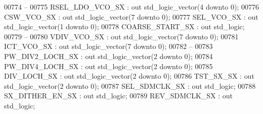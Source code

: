 \begin{DoxyCode}
00774 \textcolor{keyword}{        --}
00775         RSEL\_LDO\_VCO\_SX     : \textcolor{keywordflow}{out} \textcolor{comment}{std\_logic\_vector}(\textcolor{vhdllogic}{}\textcolor{vhdllogic}{4} \textcolor{keywordflow}{downto} \textcolor{vhdllogic}{}\textcolor{vhdllogic}{0});
00776         CSW\_VCO\_SX              : \textcolor{keywordflow}{out} \textcolor{comment}{std\_logic\_vector}(\textcolor{vhdllogic}{}\textcolor{vhdllogic}{7} \textcolor{keywordflow}{downto} \textcolor{vhdllogic}{}\textcolor{vhdllogic}{0});
00777         SEL\_VCO\_SX              : \textcolor{keywordflow}{out} \textcolor{comment}{std\_logic\_vector}(\textcolor{vhdllogic}{}\textcolor{vhdllogic}{1} \textcolor{keywordflow}{downto} \textcolor{vhdllogic}{}\textcolor{vhdllogic}{0});
00778         COARSE\_START\_SX     : \textcolor{keywordflow}{out} \textcolor{comment}{std\_logic};
00779 \textcolor{keyword}{        --}
00780         VDIV\_VCO\_SX : \textcolor{keywordflow}{out} \textcolor{comment}{std\_logic\_vector}(\textcolor{vhdllogic}{}\textcolor{vhdllogic}{7} \textcolor{keywordflow}{downto} \textcolor{vhdllogic}{}\textcolor{vhdllogic}{0});
00781         ICT\_VCO\_SX  : \textcolor{keywordflow}{out} \textcolor{comment}{std\_logic\_vector}(\textcolor{vhdllogic}{}\textcolor{vhdllogic}{7} \textcolor{keywordflow}{downto} \textcolor{vhdllogic}{}\textcolor{vhdllogic}{0});
00782 \textcolor{keyword}{        --}
00783         PW\_DIV2\_LOCH\_SX     : \textcolor{keywordflow}{out} \textcolor{comment}{std\_logic\_vector}(\textcolor{vhdllogic}{}\textcolor{vhdllogic}{2} \textcolor{keywordflow}{downto} \textcolor{vhdllogic}{}\textcolor{vhdllogic}{0});
00784         PW\_DIV4\_LOCH\_SX     : \textcolor{keywordflow}{out} \textcolor{comment}{std\_logic\_vector}(\textcolor{vhdllogic}{}\textcolor{vhdllogic}{2} \textcolor{keywordflow}{downto} \textcolor{vhdllogic}{}\textcolor{vhdllogic}{0});
00785         DIV\_LOCH\_SX             : \textcolor{keywordflow}{out} \textcolor{comment}{std\_logic\_vector}(\textcolor{vhdllogic}{}\textcolor{vhdllogic}{2} \textcolor{keywordflow}{downto} \textcolor{vhdllogic}{}\textcolor{vhdllogic}{0});
00786         TST\_SX\_SX                   : \textcolor{keywordflow}{out} \textcolor{comment}{std\_logic\_vector}(\textcolor{vhdllogic}{}\textcolor{vhdllogic}{2} \textcolor{keywordflow}{downto} \textcolor{vhdllogic}{}\textcolor{vhdllogic}{0});
00787         SEL\_SDMCLK\_SX           : \textcolor{keywordflow}{out} \textcolor{comment}{std\_logic};
00788         SX\_DITHER\_EN\_SX     : \textcolor{keywordflow}{out} \textcolor{comment}{std\_logic};
00789         REV\_SDMCLK\_SX           : \textcolor{keywordflow}{out} \textcolor{comment}{std\_logic};

\end{DoxyCode}
